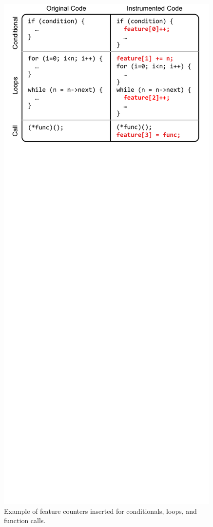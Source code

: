\begin{figure}
  \begin{center}
    \includegraphics{exec_time_prediction/figs/features.pdf}
    \caption{Example of feature counters inserted for conditionals, loops, and
    function calls.}
    \label{fig:exec_time_prediction.prediction.features}
  \end{center}
\end{figure}


